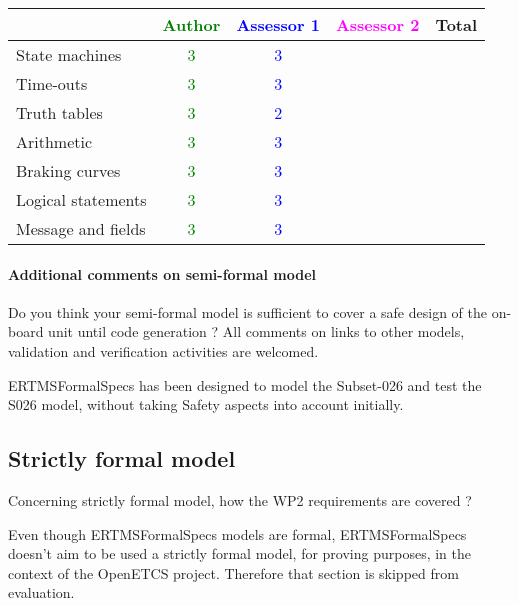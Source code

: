 \begin{tabular}{|l | c | c | c | c|}
\hline
& \textcolor{green}{Author} & \textcolor{blue}{Assessor 1} & \textcolor{magenta}{Assessor 2} & Total \\
\hline 
State machines  & \textcolor{green}{3} & \textcolor{blue}{3} & &  \\
\hline
Time-outs  & \textcolor{green}{3} & \textcolor{blue}{3} & &  \\
\hline
Truth tables  & \textcolor{green}{3} & \textcolor{blue}{2} & &  \\
\hline
Arithmetic  & \textcolor{green}{3} & \textcolor{blue}{3} & &  \\
\hline
Braking curves  & \textcolor{green}{3} & \textcolor{blue}{3} & &  \\
\hline
Logical statements & \textcolor{green}{3} & \textcolor{blue}{3} & &  \\
\hline
Message and fields & \textcolor{green}{3} & \textcolor{blue}{3} & &  \\
\hline
\end{tabular}

\paragraph{Additional comments on semi-formal  model} Do you think your semi-formal  model is sufficient to cover a safe design of the on-board unit until code generation ?
All comments on links to  other models, validation and verification activities are welcomed.

\begin{author_comment}
ERTMSFormalSpecs has been designed to model the Subset-026 and test the S026 model, without taking Safety aspects into account initially.    
\end{author_comment}
\subsection{Strictly formal model}

Concerning strictly formal model, how the WP2 requirements are covered ?

\begin{author_comment}
Even though ERTMSFormalSpecs models are formal, ERTMSFormalSpecs doesn't aim to be used a strictly formal model, for proving purposes, in the context of the OpenETCS project. Therefore that section is skipped from evaluation.  
\end{author_comment}

